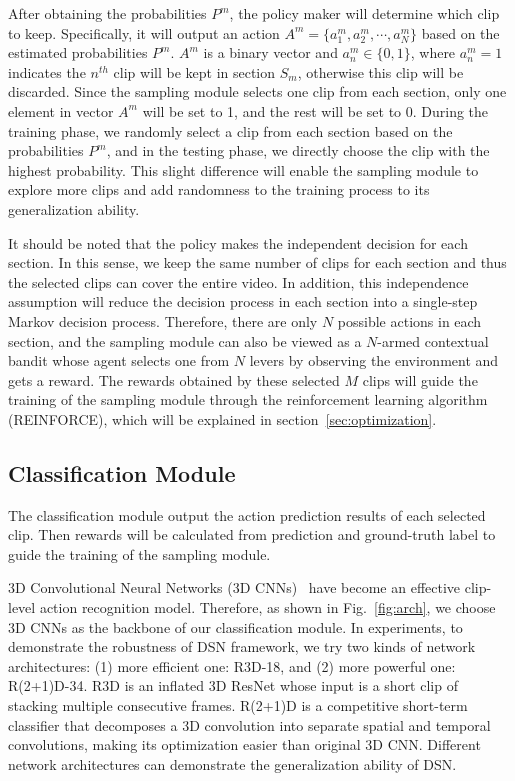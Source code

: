 \documentclass[journal]{IEEEtran}
\begin{document}
After obtaining the probabilities $P^m$, the policy maker will determine which clip to keep.
Specifically, it will output an action $A^m=\{a^m_1, a^m_2, \cdots, a^m_N\}$ based on the estimated probabilities $P^m$. $A^m$ is a binary vector and $a^m_n \in \{0,1\}$, where $a^m_n = 1$ indicates the $n^{th}$ clip will be kept in section $S_m$, otherwise this clip will be discarded.
Since the sampling module selects one clip from each section, only one element in vector $A^m$ will be set to 1, and the rest will be set to 0.
During the training phase, we randomly select a clip from each section based on the probabilities $P^m$, and in the testing phase, we directly choose the clip with the highest probability.
This slight difference will enable the sampling module to explore more clips and add randomness to the training process to its generalization ability.

It should be noted that the policy makes the independent decision for each section. In this sense, we keep the same number of clips for each section and thus the selected clips can cover the entire video. In addition, this independence assumption will reduce the decision process in each section into a single-step Markov decision process. Therefore, there are only $N$ possible actions in each section, and the sampling module can also be viewed as a $N$-armed contextual bandit whose agent selects one from $N$ levers by observing the environment and gets a reward.
The rewards obtained by these selected $M$ clips will guide the training of the sampling module through the reinforcement learning algorithm (REINFORCE), which will be explained in section~\ref{sec:optimization}.


\subsection{Classification Module}
\label{sec:classification}

The classification module output the action prediction results of each selected clip.
Then rewards will be calculated from prediction and ground-truth label to guide the training of the sampling module.

3D Convolutional Neural Networks (3D CNNs)~\cite{TranBFTP15,R2+1D} have become an effective clip-level action recognition model.
Therefore, as shown in Fig.~\ref{fig:arch}, we choose 3D CNNs as the backbone of our classification module.
In experiments, to demonstrate the robustness of DSN framework, we try two kinds of network architectures: (1) more efficient one: R3D-18, and (2) more powerful one: R(2+1)D-34.
R3D is an inflated 3D ResNet whose input is a short clip of stacking multiple consecutive frames.
R(2+1)D is a competitive short-term classifier that decomposes a 3D convolution into separate spatial and temporal convolutions, making its optimization easier than original 3D CNN.
Different network architectures can demonstrate the generalization ability of DSN.
\end{document}
